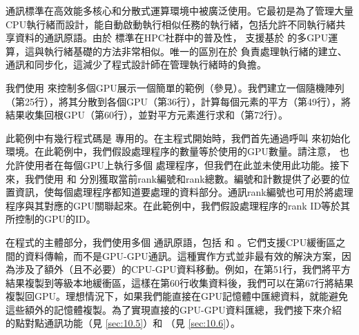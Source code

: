  通訊標準在高效能多核心和分散式運算環境中被廣泛使用。它最初是為了管理大量CPU執行緒而設計，能自動啟動執行相似任務的執行緒，包括允許不同執行緒共享資料的通訊原語。由於 標準在HPC社群中的普及性， 支援基於 的多GPU運算，這與執行緒基礎的方法非常相似。唯一的區別在於 負責處理執行緒的建立、通訊和同步化，這減少了程式設計師在管理執行緒時的負擔。

我們使用 來控制多個GPU展示一個簡單的範例（參見）。我們建立一個隨機陣列（第25行），將其分散到各個GPU（第36行），計算每個元素的平方（第49行），將結果收集回根GPU（第60行），並對平方元素進行求和（第72行）。

此範例中有幾行程式碼是 專用的。在主程式開始時，我們首先通過呼叫  來初始化 環境。在此範例中，我們假設處理程序的數量等於使用的GPU數量。請注意， 也允許使用者在每個GPU上執行多個 處理程序，但我們在此並未使用此功能。接下來，我們使用 和 分別獲取當前rank編號和rank總數。編號和計數提供了必要的位置資訊，使每個處理程序都知道要處理的資料部分。通訊rank編號也可用於將處理程序與其對應的GPU關聯起來。在此範例中，我們假設處理程序的rank ID等於其所控制的GPU的ID。

在程式的主體部分，我們使用多個 通訊原語，包括 和 。它們支援CPU緩衝區之間的資料傳輸，而不是GPU-GPU通訊。這種實作方式並非最有效的解決方案，因為涉及了額外（且不必要）的CPU-GPU資料移動。例如，在第51行，我們將平方結果複製到等級本地緩衝區，這樣在第60行收集資料後，我們可以在第67行將結果複製回GPU。理想情況下，如果我們能直接在GPU記憶體中匯總資料，就能避免這些額外的記憶體複製。為了實現直接的GPU-GPU資料匯總，我們接下來介紹 的點對點通訊功能（見 \autoref{sec:10.5}）和 （見 \autoref{sec:10.6}）。

